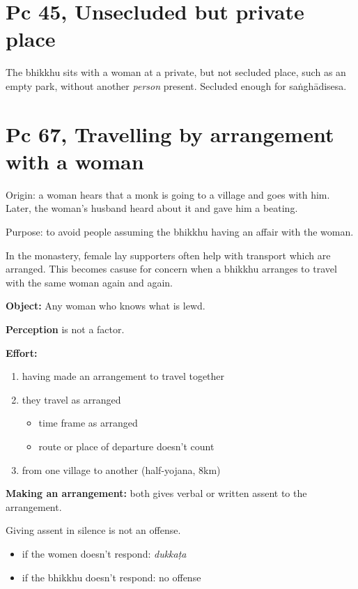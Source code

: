 \section{Pc 45, Unsecluded but private place}

The bhikkhu sits with a woman at a private, but not secluded place, such
as an empty park, without another \emph{person} present. Secluded enough
for saṅghādisesa.

\section{Pc 67, Travelling by arrangement with a woman}

Origin: a woman hears that a monk is going to a village and goes with
him. Later, the woman's husband heard about it and gave him a beating.

Purpose: to avoid people assuming the bhikkhu having an affair with the
woman.

In the monastery, female lay supporters often help with transport which
are arranged. This becomes casuse for concern when a bhikkhu arranges to
travel with the same woman again and again.

\textbf{Object:} Any woman who knows what is lewd.

\textbf{Perception} is not a factor.

\textbf{Effort:}

\begin{enumerate}
\def\labelenumi{\arabic{enumi}.}
\tightlist
\item
  having made an arrangement to travel together
\item
  they travel as arranged

  \begin{itemize}
  \tightlist
  \item
    time frame as arranged
  \item
    route or place of departure doesn't count
  \end{itemize}
\item
  from one village to another (half-yojana, 8km)
\end{enumerate}

\textbf{Making an arrangement:} both gives verbal or written assent to
the arrangement.

Giving assent in silence is not an offense.

\begin{itemize}
\tightlist
\item
  if the women doesn't respond: \emph{dukkaṭa}
\item
  if the bhikkhu doesn't respond: no offense
\end{itemize}

